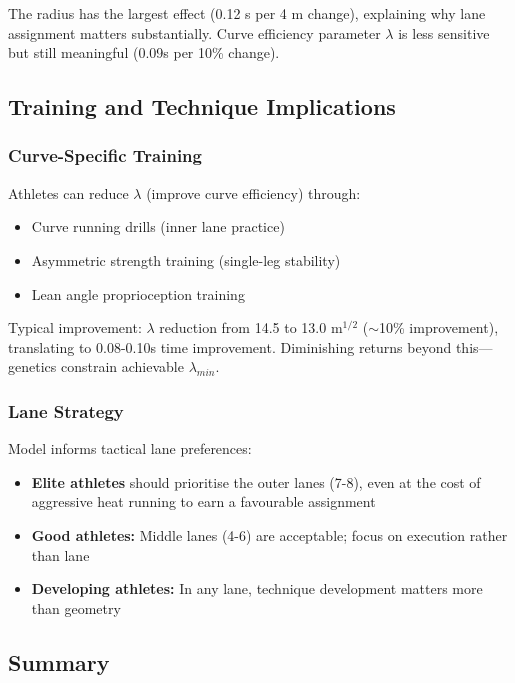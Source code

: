 The radius has the largest effect (0.12 s per 4 m change), explaining why lane assignment matters substantially. Curve efficiency parameter $\lambda$ is less sensitive but still meaningful (0.09s per 10\% change).

\subsection{Training and Technique Implications}

\subsubsection{Curve-Specific Training}

Athletes can reduce $\lambda$ (improve curve efficiency) through:
\begin{itemize}
    \item Curve running drills (inner lane practice)
    \item Asymmetric strength training (single-leg stability)
    \item Lean angle proprioception training
\end{itemize}

Typical improvement: $\lambda$ reduction from 14.5 to 13.0 m$^{1/2}$ ($\sim$10\% improvement), translating to 0.08-0.10s time improvement. Diminishing returns beyond this—genetics constrain achievable $\lambda_{min}$.

\subsubsection{Lane Strategy}

Model informs tactical lane preferences:
\begin{itemize}
    \item \textbf{Elite athletes} should prioritise the outer lanes (7-8), even at the cost of aggressive heat running to earn a favourable assignment
    \item \textbf{Good athletes:} Middle lanes (4-6) are acceptable; focus on execution rather than lane
    \item \textbf{Developing athletes:} In any lane, technique development matters more than geometry
\end{itemize}

\subsection{Summary}

